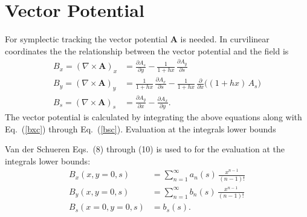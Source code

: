 \documentclass[11pt]{article}
\newcommand{\pd}[2]{\frac{\partial #1}{\partial #2}}
\newcommand{\hx}{(1+hx)}
\newcommand{\bfA}{\mathbf{A}}
\newcommand{\Eq}[1]{{Eq.~(\protect\ref{#1})}}
\begin{document}
\begin{table}[h]
\centering
\caption{Lowest order $C_{x,i,j}$, $C_{y,i,j}$, and $C_{s,i,j}$ coefficients}
\renewcommand{\arraystretch}{2.4}
\setlength{\tabcolsep}{6pt}
\end{table}

\section{Vector Potential}

For symplectic tracking the vector potential $\bfA$ is needed. In curvilinear coordinates
the the relationship between the vector potential and the field is
\begin{align}
  B_x = (\nabla\times\bfA)_x &= \pd{A_s}{y}
       - \frac{1}{1+hx}\,\pd{A_y}{s} \label{bxa} \\
  B_y = (\nabla\times\bfA)_y &= \frac{1}{1+hx}\,\pd{A_x}{s}
       - \frac{1}{1+hx}\,\pd{}{x}\!\bigl(\hx\,A_s\bigr) \label{bya}\\
  B_s = (\nabla\times\bfA)_s &= \pd{A_y}{x} - \pd{A_x}{y}. \label{bsa}
\end{align}
The vector potential is calculated by integrating the above equations along with \Eq{bxc} through
\Eq{bsc}. Evaluation at the integrals lower bounds 
 
Van der Schueren Eqs.~(8) through (10) is used to for the evaluation at the integrals lower bounds: 
\begin{align}
  B_x(x,y=0,s)   &= \sum_{n=1}^{\infty} a_n(s)\,\frac{x^{n-1}}{(n-1)!} \\[6pt]
  B_y(x,y=0,s)   &= \sum_{n=1}^{\infty} b_n(s)\,\frac{x^{n-1}}{(n-1)!} \\[6pt]
  B_s(x=0,y=0,s) &= b_s(s).
\end{align}
\end{document}

